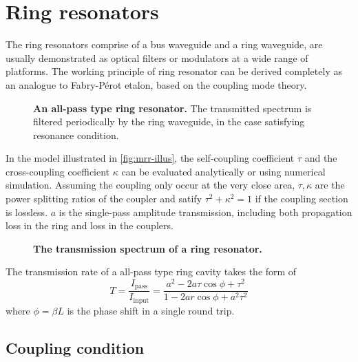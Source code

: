 \documentclass[final]{kuee_en}
\begin{document}
\section{Ring resonators}

The ring resonators comprise of a bus waveguide and a ring waveguide, are usually demonstrated as optical filters or modulators at a wide range of platforms. The working principle of ring resonator can be derived completely \cite{Bogaerts2012} as an analogue to Fabry-P\'{e}rot etalon, based on the coupling mode theory. 

\begin{figure}
    \centering
	
	\caption{\textbf{An all-pass type ring resonator.} The transmitted spectrum is filtered periodically by the ring waveguide, in the case satisfying resonance condition.}
    \label{fig:mrr-illus}
\end{figure}

In the model illustrated in \autoref{fig:mrr-illus}, the self-coupling coefficient $\tau$ and the cross-coupling coefficient $\kappa$ can be evaluated analytically or using numerical simulation. Assuming the coupling only occur at the very close area, $\tau,\kappa$ are the power splitting ratios of the coupler and satify $\tau^2 + \kappa^2 =1 $ if the coupling section is lossless. $a$ is the single-pass amplitude transmission, including both propagation loss in the ring and loss in the couplers.

\begin{figure}
    \centering
    
    \caption{\textbf{The transmission spectrum of a ring resonator.} }
    \label{fig:mrr_spec}
\end{figure}

The transmission rate of a all-pass type ring cavity takes the form of
\begin{equation}\label{eq:trans_phi}
    T = \frac{I_\mathrm{pass}}{I_\mathrm{input}} = \frac{a^2 - 2a\tau \cos \phi + \tau^2}{1 - 2ar \cos \phi + a^2 \tau^2}
\end{equation}
where $\phi=\beta L$ is the phase shift in a single round trip. 

\subsection{Coupling condition}
\end{document}
